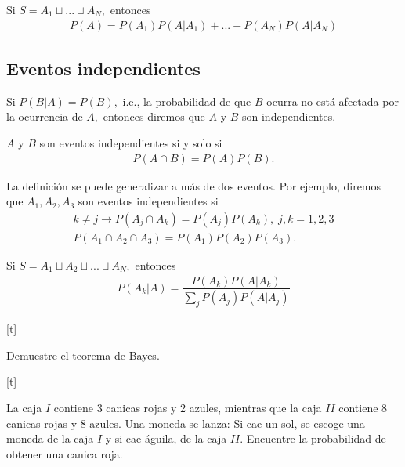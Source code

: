 {}
\begin{thm}
 \label{thm:0.1.10} Si $S=A_{1}\sqcup ... \sqcup A_{N},$  entonces
 \begin{align}
\label{eq:0.1.20}
P(A)=P(A_{1})P(A|A_{1})+...+P(A_{N})P(A|A_{N})
\end{align}
\end{thm}


\subsection{Eventos independientes}
{}
Si $P(B|A)=P(B),$ i.e., la probabilidad de que $B$ ocurra no está afectada por la ocurrencia de $A,$ entonces diremos que $A$ y $B$ son independientes.


\begin{defn}
 $A$ y $B$ son eventos independientes si y solo si
 \begin{align}
  \label{eq:0.1.21}
  P(A \cap B) = P(A)P(B).
 \end{align}
\end{defn}


{}
La definición se puede generalizar a más de dos eventos.  Por ejemplo, diremos que $A_{1},A_{2},A_{3}$ son eventos independientes si
\begin{align}
k\neq j \rightarrow P(A_{j} \cap A_{k})=P(A_{j})P(A_{k}), \; j,k=1,2,3 
\\ P(A_{1}\cap A_{2} \cap A_{3})=P(A_{1})P(A_{2})P(A_{3}).
\end{align}


{}
\begin{thm}
 Si $S=A_{1}\sqcup A_{2} \sqcup...\sqcup A_{N},$ entonces
 \begin{align}
  \label{eq:0.1.24}
  P(A_{k}|A) = \dfrac{P(A_{k})P(A|A_{k})}{\sum_{j} P(A_{j})P(A|A_{j})}
 \end{align}

\end{thm}



[t]
 \begin{ejemplo}
  \label{exmp:0.1.s16}
  Demuestre el teorema de Bayes.
 \end{ejemplo}



[t]{}
 \begin{ejemplo}
  \label{exmp:0.1.s15}
 La caja $I$ contiene 3 canicas rojas y 2 azules, mientras que la caja $II$ contiene $8$ canicas rojas y 8 azules. Una moneda se lanza: Si cae un sol, se escoge una moneda de la caja $I$ y si cae águila, de la caja $II.$ Encuentre la probabilidad de obtener una canica roja.
 \end{ejemplo}


